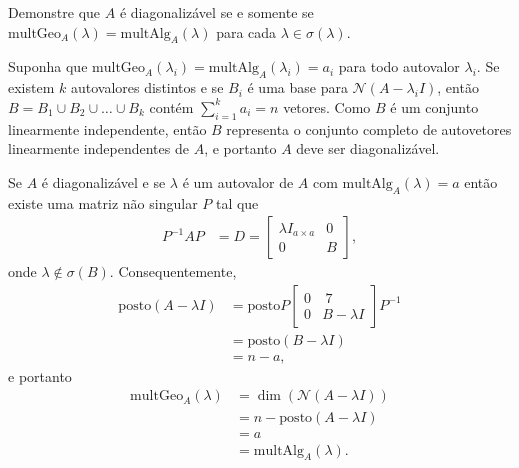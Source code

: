 \begin{questions}
     Demonstre que $A$ \'{e} diagonaliz\'{a}vel se e somente se $\mathrm{multGeo}_A(\lambda) = \mathrm{multAlg}_A(\lambda)$ para cada $\lambda \in \sigma(\lambda)$.
    \begin{solution}
        Suponha que $\mathrm{multGeo}_A(\lambda_i) = \mathrm{multAlg}_A(\lambda_i) = a_i$ para todo autovalor $\lambda_i$. Se existem $k$ autovalores distintos e se $B_i$ \'{e} uma base para $\mathcal{N}(A - \lambda_i I)$, ent\~{a}o $B = B_1 \cup B_2 \cup \ldots \cup B_k$ cont\'{e}m $\sum_{i = 1}^k a_i = n$ vetores. Como $B$ \'{e} um conjunto linearmente independente, ent\~{a}o $B$ representa o conjunto completo de autovetores linearmente independentes de $A$, e portanto $A$ deve ser diagonaliz\'{a}vel.

        Se $A$ \'{e} diagonaliz\'{a}vel e se $\lambda$ \'{e} um autovalor de $A$ com $\mathrm{multAlg}_A(\lambda) = a$ ent\~{a}o existe uma matriz n\~{a}o singular $P$ tal que
        \begin{align*}
            P^{-1} A P &= D = \begin{bmatrix}
                \lambda I_{a \times a} & 0 \\
                0 & B
            \end{bmatrix},
        \end{align*}
        onde $\lambda \not\in \sigma(B)$. Consequentemente,
        \begin{align*}
            \mathrm{posto}(A - \lambda I) &= \mathrm{posto} P \begin{bmatrix}
                0 & \ 7 \\
                0 & B - \lambda I
            \end{bmatrix} P^{-1} \\
            &= \mathrm{posto}(B - \lambda I) \\
            &= n - a,
        \end{align*}
        e portanto
        \begin{align*}
            \mathrm{multGeo}_A(\lambda) &= \dim(\mathcal{N}(A - \lambda I)) \\
            &= n - \mathrm{posto}(A - \lambda I) \\
            &= a \\
            &= \mathrm{multAlg}_A(\lambda).
        \end{align*}
    \end{solution}


\end{questions}
